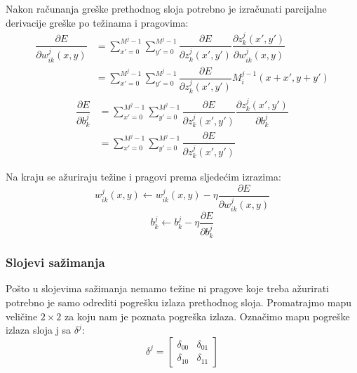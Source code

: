 \documentclass[times, utf8, zavrsni, numeric]{fer}
\begin{document}
Nakon računanja greške prethodnog sloja potrebno je izračunati parcijalne derivacije greške po težinama i pragovima:
\begin{equation}\label{eq:conv-sloj-derw}
\begin{split}
\dfrac{\partial E}{\partial w^j_{ik}(x, y)} &= \sum_{x'=0}^{M^j-1} \sum_{y'=0}^{M^j-1} \dfrac{\partial E}{\partial z^j_k (x', y')} \dfrac{\partial z^j_k (x', y')}{\partial w^j_{ik}(x, y)} \\
&= \sum_{x'=0}^{M^j-1} \sum_{y'=0}^{M^j-1} \dfrac{\partial E}{\partial z^j_k (x', y')} M^{j-1}_i (x+x', y+y')
\end{split}
\end{equation}
\begin{equation}\label{eq:conv-sloj-derb}
\begin{split}
\dfrac{\partial E}{\partial b^j_k} &= \sum_{x'=0}^{M^j-1} \sum_{y'=0}^{M^j-1} \dfrac{\partial E}{\partial z^j_k (x', y')} \dfrac{\partial z^j_k (x', y')}{\partial b^j_k} \\
&= \sum_{x'=0}^{M^j-1} \sum_{y'=0}^{M^j-1} \dfrac{\partial E}{\partial z^j_k (x', y')}
\end{split}
\end{equation}

Na kraju se ažuriraju težine i pragovi prema sljedećim izrazima:
\begin{equation}\label{eq:conv-azuriraj-w}
w^j_{ik}(x, y) \leftarrow w^j_{ik}(x, y) - \eta\dfrac{\partial E}{\partial w^j_{ik}(x, y)}
\end{equation}
\begin{equation}\label{eq:conv-azuriraj-b}
b^j_k \leftarrow b^j_k - \eta\dfrac{\partial E}{\partial b^j_k}
\end{equation}

\subsubsection{Slojevi sažimanja}
Pošto u slojevima sažimanja nemamo težine ni pragove koje treba ažurirati potrebno je samo odrediti pogrešku izlaza prethodnog sloja. Promatrajmo mapu veličine $2 \times 2$ za koju nam je poznata pogreška izlaza. Označimo mapu pogreške izlaza sloja j sa $\delta^j$:
\begin{equation}
\delta^j = \left[
\begin{matrix}
\delta_{00} & \delta_{01} \\
\delta_{10} & \delta_{11}
\end{matrix}
\right]
\end{equation}
\end{document}
